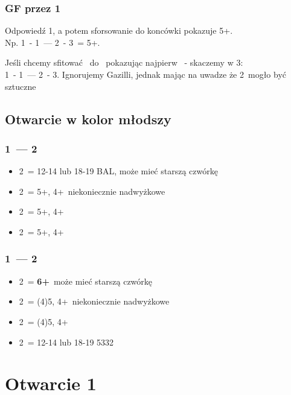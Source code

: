 \documentclass[12pt, a4paper]{article}
\newcommand*\link[1]{\hspace*{0em plus 1fill}\makebox{#1}}
\newcommand{\imp}{\color{BurntOrange}\link{\textbf{\large!}}\color{black}}
\newcommand{\vimp}{\color{OrangeRed}\link{\textbf{\large{!!}}}\color{black}}
\begin{document}
\subsubsection*{GF przez 1\spades}
    Odpowiedź 1\spades, a potem sforsowanie do koncówki pokazuje 5+\spades. \\
    Np. 1\diams\ - 1\spades\ --- 2\diams\ - 3\clubs\ = 5+\spades. \br

    Jeśli chcemy sfitować \hearts\ do \gf\ pokazując najpierw \spades\ - skaczemy w 3\hearts:\\
    1\hearts\ - 1\spades\ --- 2\clubs\ - 3\hearts. Ignorujemy Gazilli, jednak mając na uwadze że 2\clubs\ mogło być sztuczne

\pagebreak
\subsection*{Otwarcie w kolor młodszy}
\subsubsection*{1\clubs\ --- 2\clubs}
\begin{itemize}
    \item 2\diams\ = 12-14 lub 18-19 BAL, może mieć starszą czwórkę \imp
    \item 2\hearts\ = 5+\clubs, 4+\hearts\ niekoniecznie nadwyżkowe
    \item 2\spades\ = 5+\clubs, 4+\spades 
    \item 2\nt\ = 5+\clubs, 4+\diams \vimp
\end{itemize}

\subsubsection*{1\diams\ --- 2\clubs}
\begin{itemize}
    \item 2\diams\ = \textbf{6+}\diams\ może mieć starszą czwórkę \imp
    \item 2\hearts\ = (4)5\diams, 4+\hearts\ niekoniecznie nadwyżkowe
    \item 2\spades\ = (4)5\diams, 4+\spades 
    \item 2\nt\ = 12-14 lub 18-19 5332
\end{itemize}



\pagebreak
\section{Otwarcie 1\clubs}
\end{document}

